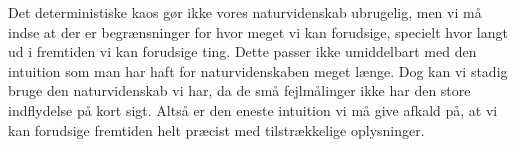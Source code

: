 \documentclass[12pt,a4paper]{article}
\theoremstyle{break}
\theoremstyle{nonumberplain}
\begin{document}
Det deterministiske kaos gør ikke vores naturvidenskab ubrugelig, men vi må indse at der er begrænsninger for hvor meget vi kan forudsige, specielt hvor langt ud i fremtiden vi kan forudsige ting. 
Dette passer ikke umiddelbart med den intuition som man har haft for naturvidenskaben meget længe. 
Dog kan vi stadig bruge den naturvidenskab vi har, da de små fejlmålinger ikke har den store indflydelse på kort sigt. 
Altså er den eneste intuition vi må give afkald på, at vi kan forudsige fremtiden helt præcist med tilstrækkelige oplysninger.
\end{document}
